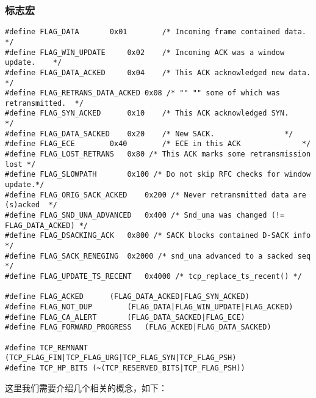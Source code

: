 		\subsubsection{标志宏}
\begin{verbatim}
#define FLAG_DATA		0x01 		/* Incoming frame contained data.		*/
#define FLAG_WIN_UPDATE		0x02 	/* Incoming ACK was a window update.	*/
#define FLAG_DATA_ACKED		0x04 	/* This ACK acknowledged new data.		*/
#define FLAG_RETRANS_DATA_ACKED	0x08 /* "" "" some of which was retransmitted.	*/
#define FLAG_SYN_ACKED		0x10 	/* This ACK acknowledged SYN.		*/
#define FLAG_DATA_SACKED	0x20 	/* New SACK.				*/
#define FLAG_ECE		0x40 		/* ECE in this ACK				*/
#define FLAG_LOST_RETRANS	0x80 /* This ACK marks some retransmission lost */
#define FLAG_SLOWPATH		0x100 /* Do not skip RFC checks for window update.*/
#define FLAG_ORIG_SACK_ACKED	0x200 /* Never retransmitted data are (s)acked	*/
#define FLAG_SND_UNA_ADVANCED	0x400 /* Snd_una was changed (!= FLAG_DATA_ACKED) */
#define FLAG_DSACKING_ACK	0x800 /* SACK blocks contained D-SACK info */
#define FLAG_SACK_RENEGING	0x2000 /* snd_una advanced to a sacked seq */
#define FLAG_UPDATE_TS_RECENT	0x4000 /* tcp_replace_ts_recent() */

#define FLAG_ACKED		(FLAG_DATA_ACKED|FLAG_SYN_ACKED)
#define FLAG_NOT_DUP		(FLAG_DATA|FLAG_WIN_UPDATE|FLAG_ACKED)
#define FLAG_CA_ALERT		(FLAG_DATA_SACKED|FLAG_ECE)
#define FLAG_FORWARD_PROGRESS	(FLAG_ACKED|FLAG_DATA_SACKED)

#define TCP_REMNANT (TCP_FLAG_FIN|TCP_FLAG_URG|TCP_FLAG_SYN|TCP_FLAG_PSH)
#define TCP_HP_BITS (~(TCP_RESERVED_BITS|TCP_FLAG_PSH))
\end{verbatim}

			这里我们需要介绍几个相关的概念，如下：

